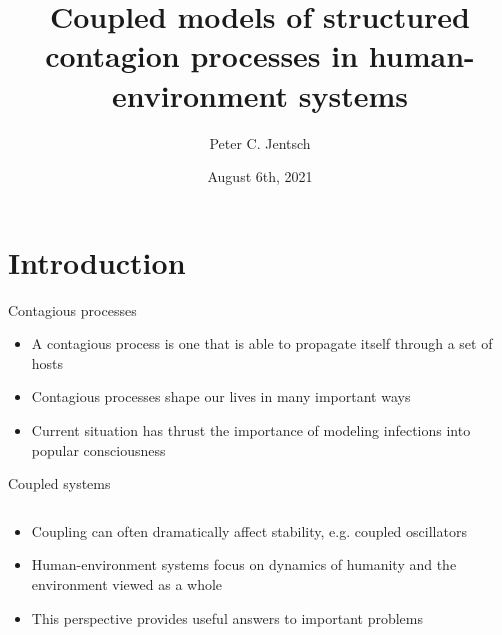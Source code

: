 \documentclass{beamer}
\title[]{Coupled models of structured contagion processes in human-environment systems}
\author{Peter C. Jentsch}
\institute[]{Department of Applied Mathematics, University Of Waterloo}
\date{August 6th, 2021}
\begin{document}

\section{Introduction}
\begin{frame}{Contagious processes}
    \begin{itemize}
        \item A contagious process is one that is able to propagate itself through a set of hosts %
        \item Contagious processes shape our lives in many important ways
        \item Current situation has thrust the importance of modeling infections into popular consciousness 
    \end{itemize}
\end{frame}

\begin{frame}{Coupled systems}
    \begin{columns}
        \begin{column}[]{\textwidth}
            \begin{itemize}
                \item Coupling can often dramatically affect stability, e.g. coupled oscillators
                \item Human-environment systems focus on dynamics of humanity and the environment viewed as a whole
                \item This perspective provides useful answers to important problems
            \end{itemize}
        \end{column}
    \end{columns}
\end{frame}
\end{document}
